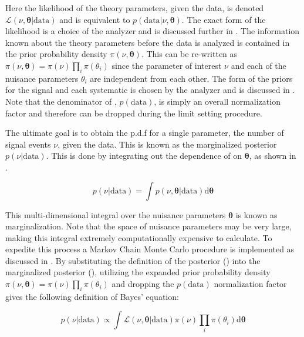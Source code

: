 Here the likelihood of the theory parameters, given the data, is denoted
$\mathcal{L}(\nu,\boldsymbol{\theta}|\text{data})$ and is equivalent to
$p(\text{data}|\nu,\boldsymbol{\theta})$.  The exact form of the likelihood is
a choice of the analyzer and is discussed further in . The
information known about the theory parameters before the data is analyzed is
contained in the prior probability density $\pi(\nu,\boldsymbol{\theta})$.
This can be re-written as $\pi(\nu,\boldsymbol{\theta}) =
\pi(\nu)\prod_{i}\pi(\theta_i)$ since the parameter of interest $\nu$ and each
of the nuisance parameters $\theta_i$ are independent from each other.  The form
of the priors for the signal and each systematic is chosen by the analyzer and
is discussed in .  Note that the denominator of
, $p(\text{data})$, is simply an overall normalization
factor and therefore can be dropped during the limit setting procedure.

The ultimate goal is to obtain the p.d.f for a single parameter, the number of
signal events $\nu$, given the data.  This is known as the marginalized
posterior $p(\nu|\text{data})$.  This is done by integrating out the dependence
of  on $\boldsymbol{\theta}$, as shown in
.

\begin{equation} \label{eq:fit:marginalization}
p(\nu|\text{data}) = \int p(\nu,\boldsymbol{\theta}|\text{data})\text{d}\boldsymbol{\theta}
\end{equation}

This multi-dimensional integral over the nuisance parameters $\boldsymbol{\theta}$ is known as
marginalization.  Note that the space of nuisance parameters may be very large,
making this integral extremely computationally expensive to calculate.  To
expedite this process a Markov Chain Monte Carlo procedure is implemented as
discussed in . By substituting the definition of the
posterior () into the marginalized posterior
(), utilizing the expanded prior probability
density $\pi(\nu,\boldsymbol{\theta}) = \pi(\nu)\prod_{i}\pi(\theta_i)$ and
dropping the $p(\text{data})$ normalization factor gives the following
definition of Bayes' equation: 

\begin{equation} \label{eq:fit:bayes}
p(\nu|\text{data}) \propto \int \mathcal{L}(\nu,\boldsymbol{\theta}|\text{data})\pi(\nu)\prod_{i}\pi(\theta_i)\text{d}\boldsymbol{\theta}
\end{equation}

